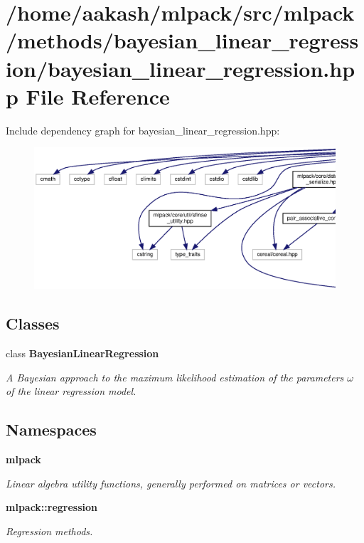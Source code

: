\section{/home/aakash/mlpack/src/mlpack/methods/bayesian\+\_\+linear\+\_\+regression/bayesian\+\_\+linear\+\_\+regression.hpp File Reference}
\label{bayesian__linear__regression_8hpp}
Include dependency graph for bayesian\+\_\+linear\+\_\+regression.\+hpp\+:
\nopagebreak
\begin{figure}[H]
\begin{center}
\leavevmode
\includegraphics[width=350pt]{bayesian__linear__regression_8hpp__incl}
\end{center}
\end{figure}
\subsection*{Classes}
\begin{DoxyCompactItemize}
\item 
class \textbf{ Bayesian\+Linear\+Regression}
\begin{DoxyCompactList}\small\item\em A Bayesian approach to the maximum likelihood estimation of the parameters $ \omega $ of the linear regression model. \end{DoxyCompactList}\end{DoxyCompactItemize}
\subsection*{Namespaces}
\begin{DoxyCompactItemize}
\item 
 \textbf{ mlpack}
\begin{DoxyCompactList}\small\item\em Linear algebra utility functions, generally performed on matrices or vectors. \end{DoxyCompactList}\item 
 \textbf{ mlpack\+::regression}
\begin{DoxyCompactList}\small\item\em Regression methods. \end{DoxyCompactList}\end{DoxyCompactItemize}


